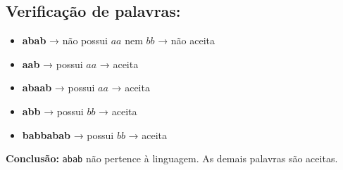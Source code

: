 \documentclass[12pt]{article}
\begin{document}
\subsection*{Verificação de palavras:}

\begin{itemize}
  \item \textbf{abab} → não possui $aa$ nem $bb$ →  não aceita
  \item \textbf{aab} → possui $aa$ → aceita
  \item \textbf{abaab} → possui $aa$ → aceita
  \item \textbf{abb} → possui $bb$ → aceita
  \item \textbf{babbabab} → possui $bb$ → aceita
\end{itemize}

\textbf{Conclusão:}  
\texttt{abab} não pertence à linguagem.  
As demais palavras são aceitas.
\end{document}
